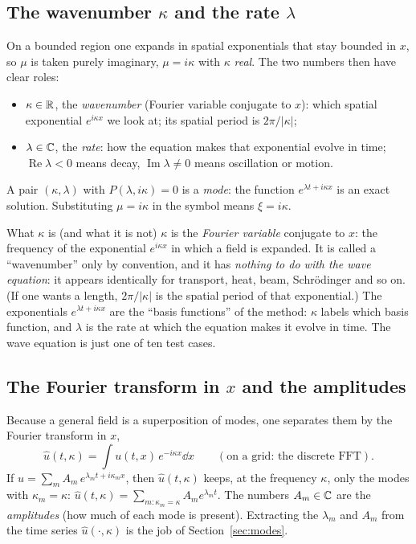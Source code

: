 \subsection{The wavenumber $\kappa$ and the rate $\lambda$}
On a bounded region one expands in spatial exponentials that stay bounded in $x$, so $\mu$ is taken purely imaginary, $\mu=i\kappa$ with $\kappa$ \emph{real}. The two numbers then have clear roles:
\begin{itemize}[nosep]
\item $\kappa\in\mathbb{R}$, the \emph{wavenumber} (Fourier variable conjugate to $x$): which spatial exponential $e^{i\kappa x}$ we look at; its spatial period is $2\pi/|\kappa|$;
\item $\lambda\in\mathbb{C}$, the \emph{rate}: how the equation makes that exponential evolve in time; $\operatorname{Re}\lambda<0$ means decay, $\operatorname{Im}\lambda\neq0$ means oscillation or motion.
\end{itemize}
A pair $(\kappa,\lambda)$ with $P(\lambda,i\kappa)=0$ is a \emph{mode}: the function $e^{\lambda t+i\kappa x}$ is an exact solution. Substituting $\mu=i\kappa$ in the symbol means $\xi=i\kappa$.

\begin{notebox}{What $\kappa$ is (and what it is not)}
$\kappa$ is the \emph{Fourier variable} conjugate to $x$: the frequency of the exponential $e^{i\kappa x}$ in which a field is expanded. It is called a ``wavenumber'' only by convention, and it has \emph{nothing to do with the wave equation}: it appears identically for transport, heat, beam, Schr\"odinger and so on. (If one wants a length, $2\pi/|\kappa|$ is the spatial period of that exponential.) The exponentials $e^{\lambda t+i\kappa x}$ are the ``basis functions'' of the method: $\kappa$ labels which basis function, and $\lambda$ is the rate at which the equation makes it evolve in time. The wave equation is just one of ten test cases.
\end{notebox}

\subsection{The Fourier transform in $x$ and the amplitudes}
Because a general field is a superposition of modes, one separates them by the Fourier transform in $x$,
\[
\hat u(t,\kappa)=\int u(t,x)\,e^{-i\kappa x}\dd x\qquad(\text{on a grid: the discrete FFT}).
\]
If $u=\sum_mA_m\,e^{\lambda_mt+i\kappa_mx}$, then $\hat u(t,\kappa)$ keeps, at the frequency $\kappa$, only the modes with $\kappa_m=\kappa$: $\hat u(t,\kappa)=\sum_{m:\kappa_m=\kappa}A_me^{\lambda_mt}$. The numbers $A_m\in\mathbb{C}$ are the \emph{amplitudes} (how much of each mode is present). Extracting the $\lambda_m$ and $A_m$ from the time series $\hat u(\cdot,\kappa)$ is the job of Section~\ref{sec:modes}.

